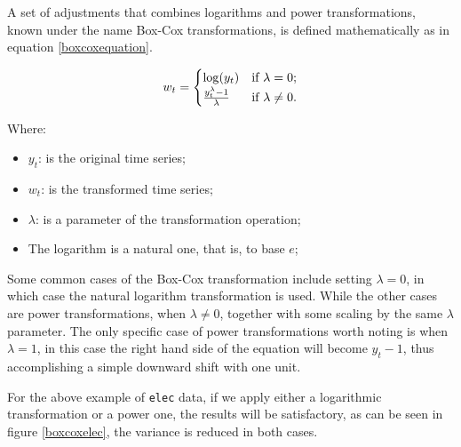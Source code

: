 \documentclass[12pt,a4paper,titlepage]{report}
\begin{document}
A set of adjustments that combines logarithms and power transformations, known under the name Box-Cox transformations, is defined mathematically as in equation \ref{boxcoxequation}.

\begin{equation}
w_t  =
\begin{cases}
\log(y_t)                     & \text{if $ \lambda = 0 $};  \\
\frac{y_t^\lambda-1}{\lambda} & \text{if $ \lambda \ne 0 $}.
\end{cases}
\label{boxcoxequation} 
\end{equation}

Where:
\begin{itemize}
    \item $ y_{t} $: is the original time series;
    \item $ w_{t} $: is the transformed time series;
    \item $ \lambda $: is a parameter of the transformation operation;    
    \item The logarithm is a natural one, that is, to base $ e $;
\end{itemize}

Some common cases of the Box-Cox transformation include setting $ \lambda = 0 $, in which case the natural logarithm transformation is used. While the other cases are power transformations, when $ \lambda \ne 0 $, together with some scaling by the same $ \lambda $ parameter. The only specific case of power transformations worth noting is when $ \lambda = 1 $, in this case the right hand side of the equation will become $ y_{t} - 1 $, thus accomplishing a simple downward shift with one unit.

For the above example of \texttt{elec} data, if we apply either a logarithmic transformation or a power one, the results will be satisfactory, as can be seen in figure \ref{boxcoxelec}, the variance is reduced in both cases. 
\end{document}
